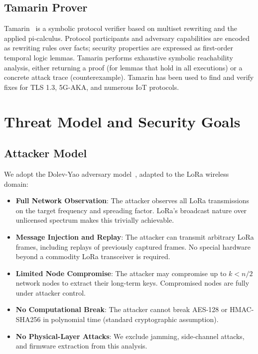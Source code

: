 \documentclass[journal]{IEEEtran}
\begin{document}
\subsection{Tamarin Prover}

Tamarin~\cite{ieee2025-adr-eventb} is a symbolic protocol verifier
based on multiset rewriting and the applied pi-calculus. Protocol
participants and adversary capabilities are encoded as rewriting rules
over facts; security properties are expressed as first-order temporal
logic lemmas. Tamarin performs exhaustive symbolic reachability analysis,
either returning a proof (for lemmas that hold in all executions) or a
concrete attack trace (counterexample). Tamarin has been used to find
and verify fixes for TLS 1.3, 5G-AKA, and numerous IoT protocols.

\section{Threat Model and Security Goals}
\label{sec:threat}

\subsection{Attacker Model}

We adopt the Dolev-Yao adversary model~\cite{springer2026-adr-mobility},
adapted to the LoRa wireless domain:

\begin{itemize}
  \item \textbf{Full Network Observation}: The attacker observes all
    LoRa transmissions on the target frequency and spreading factor.
    LoRa's broadcast nature over unlicensed spectrum makes this
    trivially achievable.

  \item \textbf{Message Injection and Replay}: The attacker can
    transmit arbitrary LoRa frames, including replays of previously
    captured frames. No special hardware beyond a commodity LoRa
    transceiver is required.

  \item \textbf{Limited Node Compromise}: The attacker may compromise
    up to $k < n/2$ network nodes to extract their long-term keys.
    Compromised nodes are fully under attacker control.

  \item \textbf{No Computational Break}: The attacker cannot break
    AES-128 or HMAC-SHA256 in polynomial time (standard cryptographic
    assumption).

  \item \textbf{No Physical-Layer Attacks}: We exclude jamming,
    side-channel attacks, and firmware extraction from this analysis.
\end{itemize}
\end{document}
